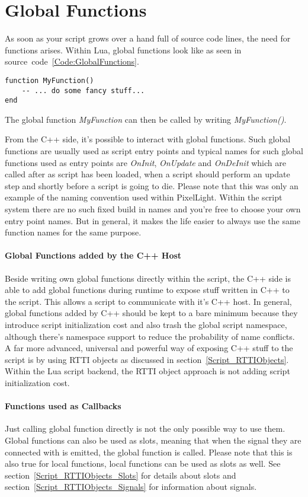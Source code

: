 \section{Global Functions}
\label{Script_GlobalFunctions}
As soon as your script grows over a hand full of source code lines, the need for functions arises. Within Lua, global functions look like as seen in source~code~\ref{Code:GlobalFunctions}.
\begin{lstlisting}[float=htb,label=Code:GlobalFunctions,caption={Global functions}]
function MyFunction()
	-- ... do some fancy stuff...
end
\end{lstlisting}
The global function \emph{MyFunction} can then be called by writing \emph{MyFunction()}.

From the C++ side, it's possible to interact with global functions. Such global functions are usually used as script entry points and typical names for such global functions used as entry points are \emph{OnInit}, \emph{OnUpdate} and \emph{OnDeInit} which are called after as script has been loaded, when a script should perform an update step and shortly before a script is going to die. Please note that this was only an example of the naming convention used within PixelLight. Within the script system there are no such fixed build in names and you're free to choose your own entry point names. But in general, it makes the life easier to always use the same function names for the same purpose.


\paragraph{Global Functions added by the C++ Host}
Beside writing own global functions directly within the script, the C++ side is able to add global functions during runtime to expose stuff written in C++ to the script. This allows a script to communicate with it's C++ host. In general, global functions added by C++ should be kept to a bare minimum because they introduce script initialization cost and also trash the global script namespace, although there's namespace support to reduce the probability of name conflicts. A far more advanced, universal and powerful way of exposing C++ stuff to the script is by using \ac{RTTI} objects as discussed in section~\ref{Script_RTTIObjects}. Within the Lua script backend, the \ac{RTTI} object approach is not adding script initialization cost.


\paragraph{Functions used as Callbacks}
Just calling global function directly is not the only possible way to use them. Global functions can also be used as slots, meaning that when the signal they are connected with is emitted, the global function is called. Please note that this is also true for local functions, local functions can be used as slots as well. See section~\ref{Script_RTTIObjects_Slots} for details about slots and section~\ref{Script_RTTIObjects_Signals} for information about signals.


